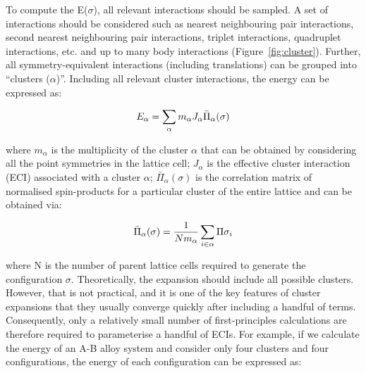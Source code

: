 \documentclass[../main.tex]{subfiles}
\begin{document}
To compute the E($\sigma$), all relevant interactions should be sampled. A set of interactions should be considered such as nearest neighbouring pair interactions, second nearest neighbouring pair interactions, triplet interactions, quadruplet interactions, etc. and up to many body interactions (Figure~\ref{fig:cluster}). Further, all symmetry-equivalent interactions (including translations) can be grouped into ``clusters ($\alpha$)''. Including all relevant cluster interactions, the energy can be expressed as:

\begin{equation}
    \centering
    {E}_{\alpha}=\sum_\alpha {m_\alpha}{J_\alpha}{\bar{\Pi}_\alpha(\sigma)}
    \label{eq:clusters}
\end{equation} 

where $m_\alpha$ is the multiplicity of the cluster $\alpha$ that can be obtained by considering all the point symmetries in the lattice cell; $J_\alpha$ is the effective cluster interaction (ECI) associated with a cluster $\alpha$; $\bar{\Pi}_\alpha(\sigma)$ is the correlation matrix of normalised spin-products for a particular cluster of the entire lattice and can be obtained via:

\begin{equation}
    \centering
    {\bar{\Pi}_\alpha(\sigma)}=\frac{1}{N{m_\alpha}}\sum_{i\in\alpha} {\Pi{\sigma_i}}
    \label{eq:correlation_matrix}
\end{equation} 

where N is the number of parent lattice cells required to generate the configuration $\sigma$. Theoretically, the expansion should include all possible clusters. However, that is not practical, and it is one of the key features of cluster expansions that they usually converge quickly after including a handful of terms.\cite{VanderVen2001} Consequently, only a relatively small number of first-principles calculations are therefore required to parameterise a handful of ECIs. For example, if we calculate the energy of an A-B alloy system and consider only four clusters and four configurations, the energy of each configuration can be expressed as:
\end{document}
